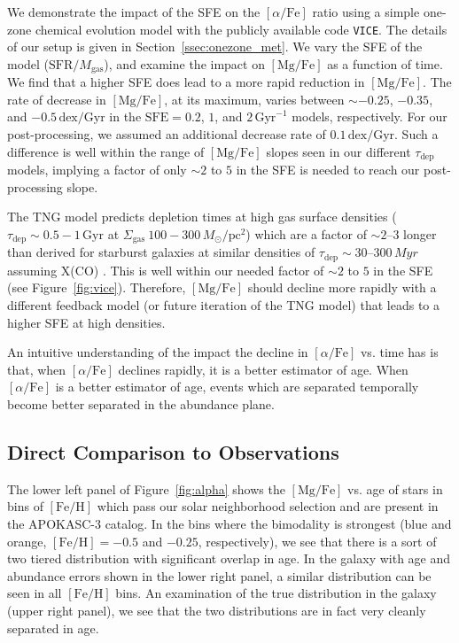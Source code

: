 \documentclass[twocolumn,linenumbers]{aastex631}
\newcommand{\Msun}{\ensuremath{M_{\odot}}}
\newcommand{\Gyr}{\ensuremath{\textrm{Gyr}}}
\newcommand{\pc}{\ensuremath{\textrm{pc}}}
\newcommand{\FeH}{\ensuremath{[\textrm{Fe}/\textrm{H}]}}
\newcommand{\MgFe}{\ensuremath{[\textrm{Mg}/\textrm{Fe}]}}
\newcommand{\alphaFe}{\ensuremath{[\alpha/\textrm{Fe}]}}
\newcommand{\dex}{\ensuremath{\textrm{dex}}}
\begin{document}
We demonstrate the impact of the SFE on the \alphaFe{} ratio using a simple one-zone chemical evolution model with the publicly available code \texttt{VICE}. The details of our setup is given in Section~\ref{ssec:onezone_met}. We vary the SFE of the model ($\textrm{SFR}/M_{\textrm{gas}}$), and examine the impact on \MgFe{} as a function of time. We find that a higher SFE does lead to a more rapid reduction in \MgFe{}. The rate of decrease in \MgFe{}, at its maximum, varies between $\sim-0.25$, $-0.35$, and $-0.5\,\dex/\Gyr$ in the $\textrm{SFE}=0.2$, $1$, and $2\,\Gyr^{-1}$ models, respectively. For our post-processing, we assumed an additional decrease rate of $0.1\,\dex/\Gyr$. Such a difference is well within the range of \MgFe{} slopes seen in our different $\tau_{\textrm{dep}}$ models, implying a factor of only $\sim2$ to $5$ in the SFE is needed to reach our post-processing slope.

The TNG model predicts depletion times at high gas surface densities ($\tau_{\textrm{dep}}\sim0.5-1\,\Gyr$ at $\Sigma_{\textrm{gas}} ~ 100-300\,\Msun/\pc^2$) which are a factor of $\sim2$--$3$ longer than derived for starburst galaxies at similar densities of $\tau_{\textrm{dep}}\sim30$--$300\,Myr$ assuming \citet{2013ARA&A..51..207B} X(CO) \citep[see][]{2019ApJ...872...16D,2021ApJ...908...61K,2024arXiv240909121H}. This is well within our needed factor of $\sim2$ to $5$ in the SFE (see Figure~\ref{fig:vice}). Therefore, \MgFe{} should decline more rapidly with a different feedback model (or future iteration of the TNG model) that leads to a higher SFE at high densities.

An intuitive understanding of the impact the decline in \alphaFe{} vs. time has is that, when \alphaFe{} declines rapidly, it is a better estimator of age. When \alphaFe{} is a better estimator of age, events which are separated temporally become better separated in the abundance plane.

\subsection{Direct Comparison to Observations}\label{ssec:compare_obs}
The lower left panel of Figure~\ref{fig:alpha} shows the \MgFe{} vs. age of stars in bins of \FeH{} which pass our solar neighborhood selection and are present in the APOKASC-3 catalog. In the bins where the bimodality is strongest (blue and orange, $\FeH=-0.5$ and $-0.25$, respectively), we see that there is a sort of two tiered distribution with significant overlap in age. In the galaxy with age and abundance errors shown in the lower right panel, a similar distribution can be seen in all \FeH{} bins. An examination of the true distribution in the galaxy (upper right panel), we see that the two distributions are in fact very cleanly separated in age.
\end{document}
